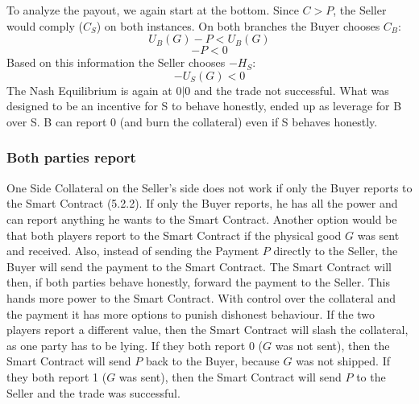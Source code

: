 \documentclass{cacthesis}
\begin{document}
To analyze the payout, we again start at the bottom. Since $C>P$, the Seller would comply ($C_S$) on both instances.\newline
On both branches the Buyer chooses $C_B$: \[U_B(G)-P < U_B(G)\] \[-P < 0\]
Based on this information the Seller chooses $-H_S$: \[-U_S(G) < 0\]
The Nash Equilibrium is again at $0|0$ and the trade not successful.\newline
What was designed to be an incentive for S to behave honestly, ended up as leverage for B over S. B can report 0 (and burn the collateral) even if S behaves honestly. 



\subsubsection{Both parties report}
One Side Collateral on the Seller's side does not work if only the Buyer reports to the Smart Contract (5.2.2). If only the Buyer reports, he has all the power and can report anything he wants to the Smart Contract.\newline
Another option would be that both players report to the Smart Contract if the physical good $G$ was sent and received.\newline
Also, instead of sending the Payment $P$ directly to the Seller, the Buyer will send the payment to the Smart Contract. The Smart Contract will then, if both parties behave honestly, forward the payment to the Seller. This hands more power to the Smart Contract. With control over the collateral and the payment it has more options to punish dishonest behaviour.\newline 
If the two players report a different value, then the Smart Contract will slash the collateral, as one party has to be lying. If they both report 0 ($G$ was not sent), then the Smart Contract will send $P$ back to the Buyer, because $G$ was not shipped. If they both report 1 ($G$ was sent), then the Smart Contract will send $P$ to the Seller and the trade was successful.\newline
 
\end{document}
